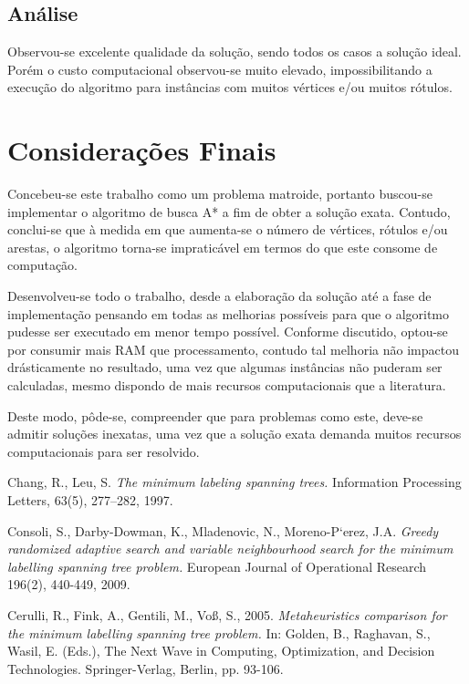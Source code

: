 \documentclass[12pt]{article}
\begin{document}
	\subsection{Análise}\label{sec:analise}

	Observou-se excelente qualidade da solução, sendo todos os casos a solução ideal. Porém o custo computacional observou-se muito elevado, impossibilitando a execução do algoritmo para instâncias com muitos vértices e/ou muitos rótulos.

\section{Considerações Finais}\label{sec:conclusao}
	
	Concebeu-se este trabalho como um problema matroide, portanto buscou-se implementar o algoritmo de busca A* a fim de obter a solução exata. Contudo, conclui-se que à medida em que aumenta-se o número de vértices, rótulos e/ou arestas, o algoritmo torna-se impraticável em termos do que este consome de computação.

	Desenvolveu-se todo o trabalho, desde a elaboração da solução até a fase de implementação pensando em todas as melhorias possíveis para que o algoritmo pudesse ser executado em menor tempo possível. Conforme discutido, optou-se por consumir mais RAM que processamento, contudo tal melhoria não impactou drásticamente no resultado, uma vez que algumas instâncias não puderam ser calculadas, mesmo dispondo de mais recursos computacionais que a literatura.

	Deste modo, pôde-se, compreender que para problemas como este, deve-se admitir soluções inexatas, uma vez que a solução exata demanda muitos recursos computacionais para ser resolvido.




\begin{thebibliography}{}

	Chang, R., Leu, S.
	\newblock \textit{The minimum labeling spanning trees.}
	\newblock Information Processing Letters, 63(5), 277–282, 1997.
	
	Consoli, S., Darby-Dowman, K., Mladenovic, N., Moreno-P`erez, J.A.
	\newblock \textit{Greedy randomized adaptive search and variable neighbourhood search for the minimum labelling spanning tree problem.}
	\newblock European Journal of Operational Research 196(2), 440-449, 2009.

	Cerulli, R., Fink, A., Gentili, M., Voß, S., 2005.
	\newblock \textit{Metaheuristics comparison for the minimum labelling spanning tree problem.}
	\newblock In: Golden, B., Raghavan, S., Wasil, E. (Eds.), The Next Wave in Computing, Optimization, and Decision Technologies.
	\newblock Springer-Verlag, Berlin, pp. 93-106.

\end{thebibliography}
\end{document}
